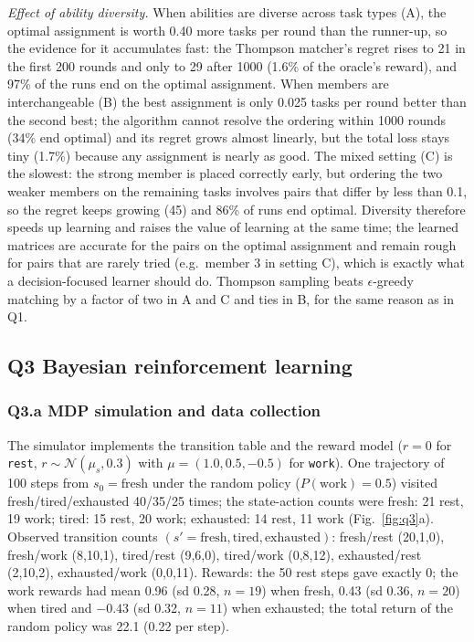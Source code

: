 \documentclass[10pt,a4paper]{article}
\newcommand{\code}[1]{\texttt{#1}}
\begin{document}
\emph{Effect of ability diversity.} When abilities are diverse across task types (A), the optimal assignment is worth 0.40 more tasks per round than the runner-up, so the evidence for it accumulates fast: the Thompson matcher's regret rises to 21 in the first 200 rounds and only to 29 after 1000 (1.6\% of the oracle's reward), and 97\% of the runs end on the optimal assignment. When members are interchangeable (B) the best assignment is only 0.025 tasks per round better than the second best; the algorithm cannot resolve the ordering within 1000 rounds (34\% end optimal) and its regret grows almost linearly, but the total loss stays tiny (1.7\%) because any assignment is nearly as good. The mixed setting (C) is the slowest: the strong member is placed correctly early, but ordering the two weaker members on the remaining tasks involves pairs that differ by less than 0.1, so the regret keeps growing (45) and 86\% of runs end optimal. Diversity therefore speeds up learning and raises the value of learning at the same time; the learned matrices are accurate for the pairs on the optimal assignment and remain rough for pairs that are rarely tried (e.g.\ member 3 in setting C), which is exactly what a decision-focused learner should do. Thompson sampling beats $\epsilon$-greedy matching by a factor of two in A and C and ties in B, for the same reason as in Q1.

\subsection{Q3 Bayesian reinforcement learning}
\subsubsection{Q3.a MDP simulation and data collection} The simulator implements the transition table and the reward model ($r=0$ for \code{rest}, $r\sim\mathcal N(\mu_s,0.3)$ with $\mu=(1.0,0.5,-0.5)$ for \code{work}). One trajectory of 100 steps from $s_0=\text{fresh}$ under the random policy ($P(\text{work})=0.5$) visited fresh/tired/exhausted 40/35/25 times; the state-action counts were fresh: 21 rest, 19 work; tired: 15 rest, 20 work; exhausted: 14 rest, 11 work (Fig.~\ref{fig:q3}a). Observed transition counts $(s'\!=\!\text{fresh},\text{tired},\text{exhausted})$: fresh/rest (20,1,0), fresh/work (8,10,1), tired/rest (9,6,0), tired/work (0,8,12), exhausted/rest (2,10,2), exhausted/work (0,0,11). Rewards: the 50 rest steps gave exactly 0; the work rewards had mean 0.96 (sd 0.28, $n{=}19$) when fresh, 0.43 (sd 0.36, $n{=}20$) when tired and $-0.43$ (sd 0.32, $n{=}11$) when exhausted; the total return of the random policy was 22.1 (0.22 per step).
\end{document}
